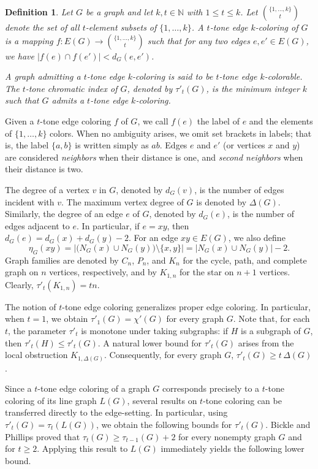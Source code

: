 \documentclass[12pt]{article}
\theoremstyle{plain}
\numberwithin{theorem}{section}
\numberwithin{conjecture}{section}
\numberwithin{corollary}{section}
\numberwithin{example}{section}
\numberwithin{lemma}{section}
\numberwithin{proposition}{section}
\numberwithin{problem}{section}
\numberwithin{remark}{section}
\numberwithin{claim}{theorem}
\newtheorem{definition}{Definition}
\numberwithin{definition}{section}
\begin{document}
\begin{definition}
Let $G$ be a graph and let $k,t \in \mathbb{N}$ with $1 \le t \le k$. Let $\binom{\{1,\dots,k\}}{t}$ denote the set of all $t$-element subsets of $\{1,\ldots,k\}$. A \emph{$t$-tone edge $k$-coloring} of $G$ is a mapping $f:E(G)\to \binom{\{1,\dots,k\}}{t}$ such that for any two edges $e,e'\in E(G)$, we have $|f(e)\cap f(e')|< d_G(e,e')$.

\noindent A graph admitting a $t$-tone edge $k$-coloring is said to be $t$-tone edge $k$-colorable. The $t$-tone chromatic index of $G$, denoted by $\tau'_t(G)$, is the minimum integer $k$ such that $G$ admits a $t$-tone edge $k$-coloring.
\end{definition}

Given a $t$-tone edge coloring $f$ of $G$, we call $f(e)$ the label of $e$ and the elements of $\{1,\dots,k\}$ colors. When no ambiguity arises, we omit set brackets in labels; that is, the label $\{a,b\}$ is written simply as $ab$. Edges $e$ and $e'$ (or vertices $x$ and $y$) are considered \textit{neighbors} when their distance is one, and \textit{second neighbors} when their distance is two.

The degree of a vertex $v$ in $G$, denoted by $d_G(v)$, is the number of edges incident with $v$. The maximum vertex degree of $G$ is denoted by $\Delta(G)$. Similarly, the degree of an edge $e$ of $G$, denoted by $d_G(e)$, is the number of edges adjacent to $e$. In particular, if $e=xy$, then $d_G(e)=d_G(x)+d_G(y)-2$. For an edge $xy\in E(G)$, we also define
\[
\eta_G(xy)
=
\left|\bigl(N_G(x)\cup N_G(y)\bigr)\setminus\{x,y\}\right|
=
|N_G(x)\cup N_G(y)|-2.
\] 
Graph families are denoted by $C_n$, $P_n$, and $K_n$ for the cycle, path, and complete graph on $n$ vertices, respectively, and by $K_{1,n}$ for the star on $n+1$ vertices. Clearly, $\tau'_t(K_{1,n})= tn$.

The notion of $t$-tone edge coloring generalizes proper edge coloring. In particular, when $t=1$, we obtain $\tau'_1(G)=\chi'(G)$ for every graph $G$. Note that, for each $t$, the parameter $\tau'_t$ is monotone under taking subgraphs: if $H$ is a subgraph of $G$, then $\tau'_t(H)\le \tau'_t(G)$. A natural lower bound for $\tau'_t(G)$ arises from the local obstruction $K_{1,\Delta(G)}$. Consequently, for every graph $G$, $\tau'_t(G) \ge t\,\Delta(G)$.

Since a $t$-tone edge coloring of a graph $G$ corresponds precisely to a $t$-tone coloring of its line graph $L(G)$, several results on $t$-tone coloring can be transferred directly to the edge-setting. In particular, using $\tau'_t(G)=\tau_t(L(G))$, we obtain the following bounds for $\tau'_t(G)$. Bickle and Phillips \cite{BP} proved that $\tau_t(G) \ge \tau_{t-1}(G) + 2$ for every nonempty graph $G$ and for $t \ge 2$. Applying this result to $L(G)$ immediately yields the following lower bound.
\end{document}
